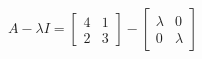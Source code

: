 \documentclass{article}
\begin{document}
\begin{align*}
A - \lambda I = \begin{bmatrix} 4 & 1 \\ 2 & 3 \end{bmatrix}- \begin{bmatrix} \lambda & 0 \\ 0 & \lambda \end{bmatrix}
\end{align*}
\end{document}
